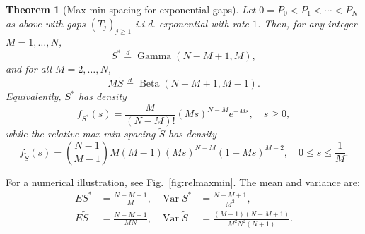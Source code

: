 \documentclass[a4paper,reqno,11pt]{amsart}
\numberwithin{equation}{section}
\newtheorem{thm}{Theorem}
\numberwithin{thm}{section}
\theoremstyle{plain}
\theoremstyle{definition}
\begin{document}
{\begin{thm}[Max-min spacing for exponential gaps]
\label{thm:main-exp}
    Let $0=P_0<P_1<\cdots< P_N$ as above with gaps $(T_j)_{j\geq1}$ i.i.d. exponential with  rate $1$. Then, for any integer $M=1,\ldots,N$,
    \begin{equation}
    \label{eq:identity_S^*}
        S^*\stackrel{d}{=}\operatorname{{Gamma}}\left(N-M+1,M\right) ,
    \end{equation}
    and for all $M=2,\ldots,N$,
     \begin{equation}
      \label{eq:identity_Stilde}
    M \widetilde{S}\stackrel{d}{=}\operatorname{Beta}(N-M + 1,M-1) .
\end{equation}
    Equivalently, $S^*$ has density
    \begin{equation}
    \label{eq:density_S^*}
   f_{S^*} (s)= \frac{M}{(N-M)!}(Ms)^{N-M}e^{-M s},\quad s\geq0 ,
\end{equation}
while the relative max-min spacing $\widetilde S$  has density
\begin{equation}
\label{eq:density_Stilde}
       f_{\widetilde{S}} (s)  
    = \binom{N-1}{M-1} M(M-1) (Ms)^{N-M} \left(1- M s\right)^{M-2},\quad 0\leq s\leq \frac{1}{M}.
\end{equation}
\end{thm}
For a numerical illustration, see Fig.~\ref{fig:relmaxmin}.
The mean and variance are:
\begin{align}
    E S^*&=\frac{N-M+1}{M},%
    & \operatorname{Var} S^*&=\frac{ N-M+1}{M^2},\\%
    E \widetilde{S}&=\frac{N-M+1}{MN},%
   &  \operatorname{Var} \widetilde{S}&=\frac{(M-1) (N-M+1)}{M^2 N^2(N+1)}.%
\end{align}


}
\end{document}
